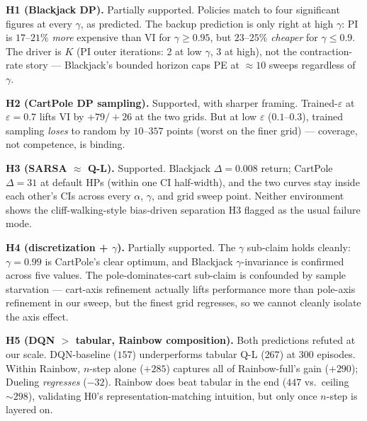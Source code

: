 \documentclass[conference]{IEEEtran}
\begin{document}
\textbf{H1 (Blackjack DP).} Partially supported. Policies match
to four significant figures at every $\gamma$, as predicted. The
backup prediction is only right at high $\gamma$: PI is $17$--$21\%$
\emph{more} expensive than VI for $\gamma \geq 0.95$, but $23$--$25\%$
\emph{cheaper} for $\gamma \leq 0.9$. The driver is $K$
(PI outer iterations: 2 at low $\gamma$, 3 at high), not the
contraction-rate story --- Blackjack's bounded horizon caps PE
at $\approx 10$ sweeps regardless of $\gamma$.

\textbf{H2 (CartPole DP sampling).} Supported, with sharper
framing. Trained-$\varepsilon$ at $\varepsilon = 0.7$ lifts VI by
$+79 / +26$ at the two grids. But at low $\varepsilon$
($0.1$--$0.3$), trained sampling \emph{loses} to random by
$10$--$357$ points (worst on the finer grid) --- coverage, not
competence, is binding.

\textbf{H3 (SARSA $\approx$ Q-L).} Supported. Blackjack
$\Delta = 0.008$ return; CartPole $\Delta = 31$ at default HPs
(within one CI half-width), and the two curves stay inside each
other's CIs across every $\alpha$, $\gamma$, and grid sweep
point. Neither environment shows the cliff-walking-style
bias-driven separation H3 flagged as the usual failure mode.

\textbf{H4 (discretization + $\gamma$).} Partially supported. The
$\gamma$ sub-claim holds cleanly: $\gamma = 0.99$ is CartPole's
clear optimum, and Blackjack $\gamma$-invariance is confirmed
across five values. The pole-dominates-cart sub-claim is
confounded by sample starvation --- cart-axis refinement actually
lifts performance more than pole-axis refinement in our sweep,
but the finest grid regresses, so we cannot cleanly isolate the
axis effect.

\textbf{H5 (DQN $>$ tabular, Rainbow composition).} Both
predictions refuted at our scale. DQN-baseline ($157$)
underperforms tabular Q-L ($267$) at 300 episodes. Within Rainbow,
$n$-step alone ($+285$) captures all of Rainbow-full's gain
($+290$); Dueling \emph{regresses} ($-32$). Rainbow does beat
tabular in the end ($447$ vs.\ ceiling $\sim 298$), validating
H0's representation-matching intuition, but only once $n$-step
is layered on.
\end{document}
